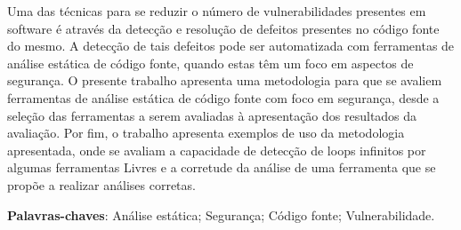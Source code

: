 \begin{resumo}

Uma das técnicas para se reduzir o número de vulnerabilidades presentes em
software é através da detecção e resolução de defeitos presentes no código fonte
do mesmo. A detecção de tais defeitos pode ser automatizada com ferramentas de
análise estática de código fonte, quando estas têm um foco em aspectos de
segurança. O presente trabalho apresenta uma metodologia para que se avaliem
ferramentas de análise estática de código fonte com foco em segurança, desde a
seleção das ferramentas a serem avaliadas à apresentação dos resultados da
avaliação. Por fim, o trabalho apresenta exemplos de uso da metodologia
apresentada, onde se avaliam a capacidade de detecção de loops infinitos por
algumas ferramentas Livres e a corretude da análise de uma ferramenta que se
propõe a realizar análises corretas. 

 \vspace{\onelineskip}
    
 \noindent
 \textbf{Palavras-chaves}: Análise estática; Segurança; Código fonte; Vulnerabilidade.
\end{resumo}
